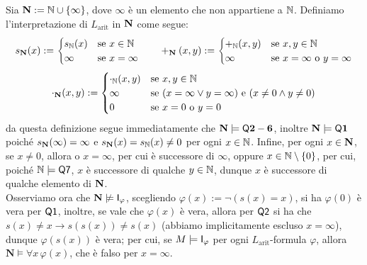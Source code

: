 \begin{soln}
    Sia $\bf N := \mathbb N \cup \{\infty\}$, dove $\infty$ è un elemento che non appartiene a $\mathbb N$. Definiamo l'interpretazione di $L_{\text{arit}}$ in $\bf N$ come segue:
    \[ s_{\bf N}(x) := \begin{cases} s_{\mathbb N}(x) & \text{se $x \in \mathbb N$} \\ \infty & \text{se $x = \infty$} \end{cases} \qquad +_{\bf N}(x,y) := \begin{cases} +_{\mathbb N}(x,y) & \text{se $x,y \in \mathbb N$} \\ \infty & \text{se $x = \infty$ o $y = \infty$} \end{cases}\]
    \[\cdot_{\bf N}(x,y) := \begin{cases} \cdot_{\mathbb N}(x,y) & \text{se $x,y \in \mathbb N$} \\ \infty & \text{se ($x = \infty \lor y = \infty$) e ($x \ne 0 \land y \ne 0$)} \\ 0 & \text{se $x = 0$ o $y = 0$} \end{cases}\]
    da questa definizione segue immediatamente che $\bf N \models \mathsf{Q}2-6$, inoltre $\bf N \models \mathsf{Q}1$ poiché $s_{\bf N}(\infty) = \infty$ e $s_{\bf N}(x) = s_{\mathbb N}(x) \ne 0$ per ogni $x \in \mathbb N$.
    Infine, per ogni $x \in \bf N$, se $x \ne 0$, allora o $x = \infty$, per cui è successore di $\infty$, oppure $x \in \mathbb N\setminus \{0\}$, per cui, poiché $\mathbb N \models \mathsf{Q7}$, $x$ è successore di qualche $y \in \mathbb N$, dunque $x$ è successore di qualche elemento di $\bf N$.\\
    Osserviamo ora che $\bf N \nmodels \mathsf{I}_\varphi$, scegliendo $\varphi(x) := \neg (s(x) = x)$, si ha $\varphi(0)$ è vera per $\sf Q1$, inoltre, se vale che $\varphi(x)$ è vera, allora per $\sf Q2$ si ha che $s(x) \ne x \to s(s(x)) \ne s(x)$ (abbiamo implicitamente escluso $x = \infty$),
    dunque $\varphi(s(x))$ è vera; per cui, se $M \models \sf I_\varphi$ per ogni $L_{\text{arit}}$-formula $\varphi$, allora $\mathbf N \models \forall x\, \varphi(x)$, che è falso per $x = \infty$. 
\end{soln}

